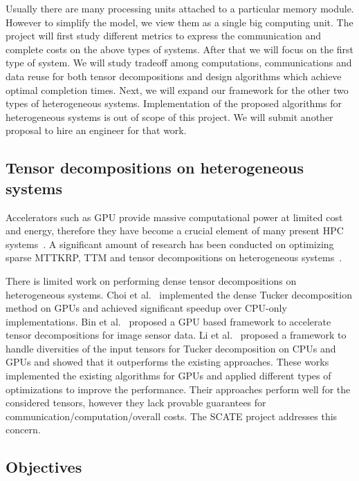 \documentclass[a4paper,11pt]{article}
\begin{document}
	Usually there are many processing units attached to a particular memory module. However to simplify the model, we view them as a single big computing unit.
	The project will first study different metrics to express the communication and complete costs on the above types of systems. After that we will focus on the first type of system. We will study tradeoff among computations, communications and data reuse for both tensor decompositions and design algorithms which achieve optimal completion times. Next, we will expand our framework for the other two types of heterogeneous systems. Implementation of the proposed algorithms for heterogeneous systems is out of scope of this project. We will submit another proposal to hire an engineer for that work. 
	
	\subsection{Tensor decompositions on heterogeneous systems}
	\label{sec:heterogeneous}
	
	Accelerators such as GPU provide massive computational power at limited cost and energy, therefore they have become a crucial element of many present HPC systems~\cite{top500}. A significant amount of research has been conducted on optimizing sparse MTTKRP, TTM and tensor decompositions on heterogeneous systems~\cite{NLSVS-IPDPS-2019,LWSD-CLUSTER-2017,parti,NHCLTSRPC-ICS-2022}. 
	
	There is limited work on performing dense tensor decompositions on heterogeneous systems. Choi et al.~\cite{CLC-SC-2018} implemented the dense Tucker decomposition method on GPUs and achieved significant speedup over CPU-only implementations. Bin et al.~\cite{BKL-SENSORS-2020} proposed a GPU based framework to accelerate tensor decompositions for image sensor data. Li et al.~\cite{li2020atucker} proposed a framework to handle diversities of the input tensors for Tucker decomposition on CPUs and GPUs and showed that it outperforms the existing approaches. These works implemented the existing algorithms for GPUs and applied different types of optimizations to improve the performance. Their approaches perform well for the considered tensors, however they lack provable guarantees for communication/computation/overall costs. The SCATE project addresses this concern.
	
		
	
	\subsection{Objectives}
	\label{sec:context:obj}
	
\end{document}
